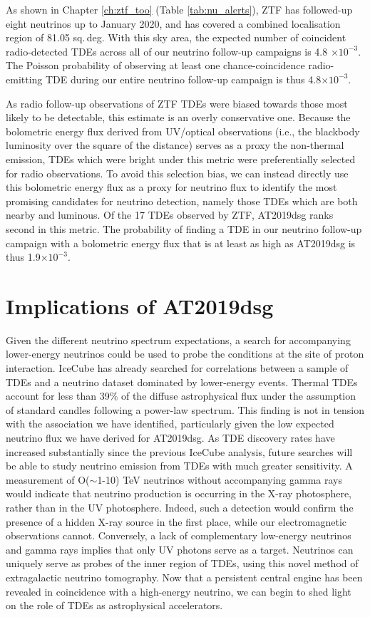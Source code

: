 As shown in Chapter \ref{ch:ztf_too} (Table \ref{tab:nu_alerts}), ZTF has followed-up eight neutrinos up to January 2020, and has covered a combined localisation region of 81.05 sq.\,deg. With this sky area, the expected number of coincident radio-detected TDEs across all of our neutrino follow-up campaigns is 4.8 $\times 10^{-3}$. The Poisson probability of observing at least one chance-coincidence radio-emitting TDE during our entire neutrino follow-up campaign is thus 4.8$ \times 10^{-3}$. 

As radio follow-up observations of ZTF TDEs were biased towards those most likely to be detectable, this estimate is an overly conservative one. Because the bolometric energy flux derived from UV/optical observations (i.e., the blackbody luminosity over the square of the distance) serves as a proxy the non-thermal emission, TDEs which were bright under this metric were preferentially selected for radio observations. To avoid this selection bias, we can instead directly use this bolometric energy flux  as a proxy for neutrino flux to identify the most promising candidates for neutrino detection, namely those TDEs which are both nearby and luminous. Of the 17 TDEs observed by ZTF, AT2019dsg ranks second in this metric. The probability of finding a TDE in our neutrino follow-up campaign with a bolometric energy flux that is at least as high as AT2019dsg is thus 1.9$ \times 10^{-3}$.

\section{Implications of AT2019dsg}

Given the different neutrino spectrum expectations, a search for accompanying lower-energy neutrinos could be used to probe the conditions at the site of proton interaction. IceCube has already searched for correlations between a sample of TDEs and a neutrino dataset dominated by lower-energy events\cite{2019ICRC...36.1016S}. Thermal TDEs account for less than 39\% of the diffuse astrophysical flux under the assumption of standard candles following a power-law spectrum. This finding is not in tension with the association we have identified, particularly given the low expected neutrino flux we have derived for AT2019dsg. As TDE discovery rates have increased substantially since the previous IceCube analysis\cite{2020arXiv200101409V, 2019ICRC...36.1016S}, future searches will be able to study neutrino emission from TDEs with much greater sensitivity. A measurement of O($\sim$1-10) TeV neutrinos without accompanying gamma rays would indicate that neutrino production is occurring in the X-ray photosphere, rather than in the UV photosphere. Indeed, such a detection would confirm the presence of a hidden X-ray source in the first place, while our electromagnetic observations cannot. Conversely, a lack of complementary low-energy neutrinos and gamma rays implies that only UV photons serve as a target. Neutrinos can uniquely serve as probes of the inner region of TDEs, using this novel method of extragalactic neutrino tomography. Now that a persistent central engine has been revealed in coincidence with a high-energy neutrino, we can begin to shed light on the role of TDEs as astrophysical accelerators.